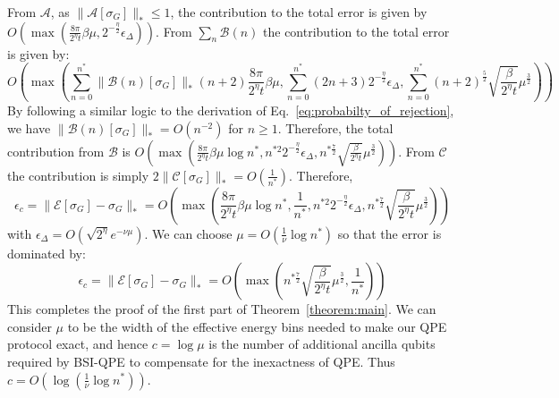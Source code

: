 \documentclass[aps,floatfix,10pt,amssymb,amsfont,amsmath,superscriptaddress,float,nofootinbib,longbibliography,nobalancelastpage,twocolumn]{revtex4-2}
\begin{document}
\begin{widetext}
From $\mathcal{A}$, as $\|\mathcal{A}[\sigma_G]\|_* \leq 1$, the contribution to the total error is given by $O(\max(\frac{8\pi}{2^{\eta}t}\beta\mu,2^{-\frac{\eta}{2}}\epsilon_{\Delta}))$. From $\sum_n\mathcal{B}(n)$ the contribution to the total error is given by:
\begin{equation}
    O\!\left(\max\!\left(\sum_{n=0}^{n^*}\|\mathcal B(n)[\sigma_G]\|_* (n+2)\frac{8\pi}{2^{\eta}t}\beta \mu,
    \sum_{n=0}^{n^*}(2n+3)2^{-\frac{\eta}{2}}\epsilon_{\Delta}, \sum_{n=0}^{n^*}(n+2)^{\frac{5}{2}}\sqrt{\frac{\beta }{2^{\eta}t}}\mu^{\frac{3}{2}}\right)\right)
\end{equation}
By following a similar logic to the derivation of Eq.~\eqref{eq:probabilty_of_rejection}, we have $\|\mathcal B(n)[\sigma_G]\|_* = O(n^{-2})$ for $n\geq1$. Therefore, the total contribution from $\mathcal{B}$ is $O(\!\max(\frac{8\pi}{2^{\eta}t}\beta \mu \log n^*,n^{*2}2^{-\frac{\eta}{2}}\epsilon_{\Delta},n^{*\frac{7}{2}}\sqrt{\frac{\beta }{2^{\eta}t}}\mu^{\frac{3}{2}}))$. From $\mathcal{C}$ the contribution is simply $2\|\mathcal{C}[\sigma_G]\|_* = O(\frac{1}{n^*})$. Therefore,
 \begin{equation}
   \epsilon_c = \|\mathcal{E}[\sigma_G] - \sigma_G\|_* = O\left(\max\left( \frac{8\pi}{2^{\eta}t}\beta\mu \log n^* ,\frac{1}{n^*}, n^{*2}2^{-\frac{\eta}{2}}\epsilon_{\Delta},n^{*\frac{7}{2}}\sqrt{\frac{\beta }{2^{\eta}t}}\mu^{\frac{3}{2}}\right)\right)
\end{equation}
with $\epsilon_{\Delta}=O(\sqrt{2^{\eta}}e^{-\nu\mu})$. We can choose $\mu = O(\frac{1}{\nu}\log n^*)$ so that the error is dominated by:
 \begin{equation}
   \epsilon_c = \|\mathcal{E}[\sigma_G] - \sigma_G\|_* = O\left(\max\left( n^{*\frac{7}{2}}\sqrt{\frac{\beta }{2^{\eta}t}}\mu^{\frac{3}{2}} ,\frac{1}{n^*}\right)\right)
    \label{eq:error_bound}
\end{equation}
This completes the proof of the first part of Theorem~\ref{theorem:main}. We can consider $\mu$ to be the width of the effective energy bins needed to make our QPE protocol exact, and hence $c=\log\mu$ is the number of additional ancilla qubits required by BSI-QPE to compensate for the inexactness of QPE. Thus $c=O(\log(\frac{1}{\nu}\log n^*))$.
\end{widetext}
\end{document}
